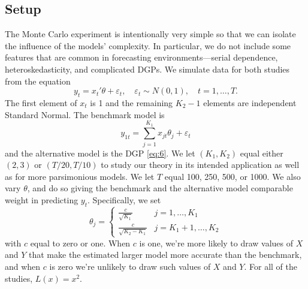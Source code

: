 \documentclass[11pt]{article}
\newcommand{\e}{\varepsilon}
\begin{document}
\subsection{Setup}\label{sec:simulation-design}
The Monte Carlo experiment is intentionally very simple so that we can
isolate the influence of the models' complexity.  In particular, we do
not include some features that are common in forecasting
environments---serial dependence, heteroskedasticity, and complicated
DGPs.  We simulate data for both studies from the equation
\begin{equation}\label{eq:6}
  y_t = x_t'\theta + \e_t,\quad \e_t \sim N(0,1),
  \quad t=1,\dots,T.
\end{equation}
The first element of $x_t$ is 1 and the remaining $K_2-1$ elements are
independent Standard Normal.  The benchmark model is
\begin{equation}
  \label{eq:1}
  y_{1t} = \sum_{j=1}^{K_1} x_{jt}\theta_j + \e_t
\end{equation}
and the alternative model is the DGP \eqref{eq:6}.  We let
$(K_1,K_2)$ equal either $(2,3)$ or $(T/20,T/10)$ to study our theory
in its intended application as well as for more parsimonious models.
We let $T$ equal 100, 250, 500, or 1000.  We also vary $\theta$, and do
so giving the benchmark and the alternative model comparable weight in
predicting $y_t$.  Specifically, we set
\begin{equation*}
  \theta_j =
\begin{cases} \frac{c}{\sqrt{K_1}} & j = 1,\dots,K_1 \\
\frac{c}{\sqrt{K_2 - K_1}} & j = K_1 + 1,\dots,K_2 \end{cases}
\end{equation*}
with $c$ equal to zero or one.  When $c$ is one, we're more likely to
draw values of $X$ and $Y$ that make the estimated larger model more
accurate than the benchmark, and when $c$ is zero we're unlikely to
draw such values of $X$ and $Y$.  For all of the studies, $L(x) =
x^2$.
\end{document}
